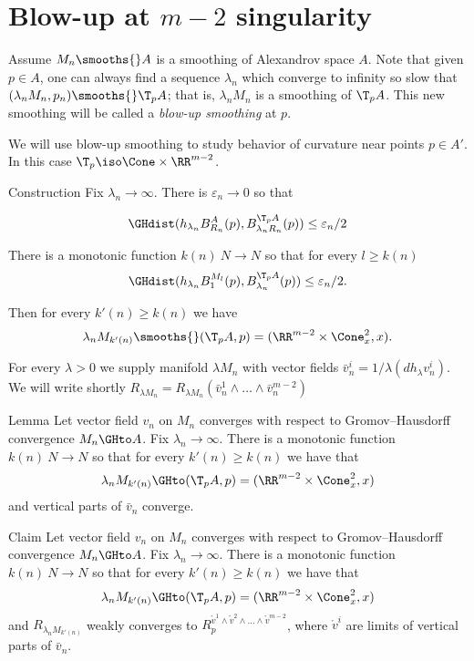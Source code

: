 

\section{Blow-up at $m-2$ singularity}\label{sec:blow}

Assume $M_n\smooths{} A$ is a smoothing of Alexandrov space $A$.
Note that given $p\in A$,
one can always find a sequence $\lambda_n$
which converge to infinity so slow that
$(\lambda_n M_n,p_n)\smooths{} \T_p A$;
that is, $\lambda_n M_n$ is a smoothing of $\T_pA$.
This new smoothing will be called a \emph{blow-up smoothing} at $p$.

We will use blow-up smoothing to study behavior of curvature near points $p\in A'$.
In this case $\T_p\iso\Cone\times \RR^{m-2}$.






\begin{thm}{Construction}\label{constr}
Fix $\lambda_n\to\infty$. There is $\varepsilon_n\to 0$ so that

$$\GHdist(h_{\lambda_n}B^A_{R_n}(p), B^{\T_p A}_{\lambda_n R_n}(p))\le\varepsilon_n/2$$

There is a monotonic function
 $k(n)\:N\to N$
so that for every $l\ge k(n)$
$$\GHdist(h_{\lambda_n}B^{M_l}_{1}(p), B^{\T_p A}_{\lambda_n}(p))\le\varepsilon_n/2.$$

Then for every  $k'(n)\ge k(n)$ we have
$$\lambda_n M_{k'(n)}\smooths{} (\T_p A, p)=(\RR^{m-2}\times \Cone_x^2,x).$$
\end{thm}
For every $\lambda>0$ we supply manifold $\lambda M_n$
with vector fields
$\bar v_n^i=1/\lambda(d h_{\lambda}v_n^i)$.
We will write shortly
$R_{\lambda M_n}=R_{\lambda M_n}(\bar v_n^1\wedge\dots\wedge\bar v_n^{m-2})$

\begin{thm}{Lemma}\label{l:convVCone}
Let vector field $v_n$ on $M_n$
converges with respect to Gromov--Hausdorff
convergence $M_n\GHto A$.
Fix $\lambda_n\to\infty$.
There is a monotonic function
 $k(n)\:N\to N$ so that  for every  $k'(n)\ge k(n)$
 we have that
$$\lambda_n M_{k'(n)}\GHto (\T_p A, p)=(\RR^{m-2}\times \Cone_x^2,x)$$
and
vertical parts of $\bar v_n$ converge.
\end{thm}

\begin{thm}{Claim}\label{cl:convVCone}
Let vector field $v_n$ on $M_n$
converges with respect to Gromov--Hausdorff
convergence $M_n\GHto A$.
Fix $\lambda_n\to\infty$.
There is a monotonic function
 $k(n)\:N\to N$ so that  for every  $k'(n)\ge k(n)$
 we have that
$$\lambda_n M_{k'(n)}\GHto (\T_p A, p)=(\RR^{m-2}\times \Cone_x^2,x)$$
and
$R_{\lambda_n M_{k'(n)}}$
weakly converges to $R^{\mathring{v}^1\wedge \mathring{v}^2\wedge\dots\wedge \mathring{v}^{m-2}}_p$,
where $\mathring{v}^i$ are limits of vertical parts of $\bar v_n$.
\end{thm}

